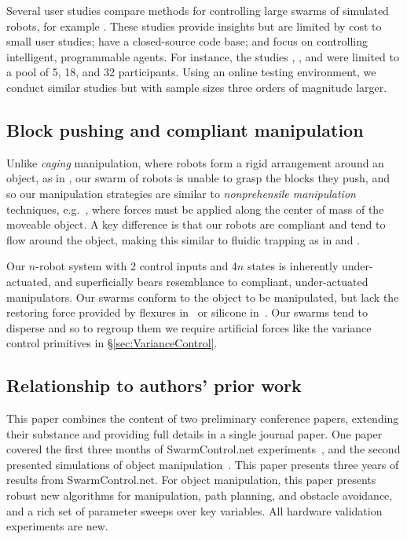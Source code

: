 Several user studies compare methods for controlling large swarms of simulated robots, for example \cite{bashyal2008human,de2012controllability,kolling2012towards}.  These studies provide insights but are limited by cost to small user studies; have a closed-source code base; and focus on controlling intelligent, programmable agents.  
For instance, the studies \cite{bashyal2008human},  \cite{de2012controllability}, and \cite{kolling2012towards}  were limited to a pool of 5, 18, and 32  participants.
	Using an online testing environment, we conduct similar studies but with sample sizes three orders of magnitude larger.

\subsection{Block pushing and compliant manipulation}
Unlike \emph{caging} manipulation, where robots form a rigid arrangement around an object, as in \cite{Sudsang2002,Fink2008}, our swarm of robots is unable to grasp the blocks they push, and so our manipulation strategies are similar to \emph{nonprehensile manipulation} techniques, e.g.~\cite{Lynch1999}, where forces must be applied along the center of mass of the moveable object. A key difference is that our robots are compliant and tend to flow around the object, making this similar to fluidic trapping as in \cite{Armani2006} and \cite{Becker2009}.  

Our $n$-robot system with 2 control inputs and 4$n$ states is inherently under-actuated, and superficially bears resemblance to compliant, under-actuated manipulators.  Our swarms conform to the object to be manipulated, but lack the restoring force provided by flexures in~\cite{odhner2014compliant} or silicone in~\cite{deimel2014novel}.  Our swarms tend to disperse and so to regroup them we require artificial forces like the variance control primitives in \S \ref{sec:VarianceControl}.

\subsection{Relationship to authors' prior work}
 This paper combines the content of two preliminary conference papers, extending their substance and providing full details in a single journal paper.  One paper covered the first three months of SwarmControl.net experiments~\cite{swarmcontrol2013}, and the second presented simulations of object manipulation~\cite{ShahrokhiIROS2015}. This paper presents three years of results from SwarmControl.net. For object manipulation, this paper presents robust new algorithms for manipulation, path planning, and obstacle avoidance, and a rich set of parameter sweeps over key variables. All hardware validation experiments are new. 
 

